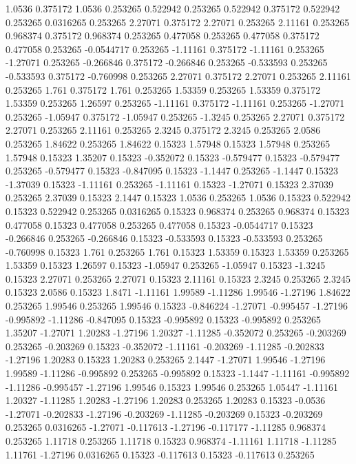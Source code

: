 1.0536 0.375172
1.0536 0.253265
0.522942 0.253265
0.522942 0.375172
0.522942 0.253265
0.0316265 0.253265
2.27071 0.375172
2.27071 0.253265
2.11161 0.253265
0.968374 0.375172
0.968374 0.253265
0.477058 0.253265
0.477058 0.375172
0.477058 0.253265
-0.0544717 0.253265
-1.11161 0.375172
-1.11161 0.253265
-1.27071 0.253265
-0.266846 0.375172
-0.266846 0.253265
-0.533593 0.253265
-0.533593 0.375172
-0.760998 0.253265
2.27071 0.375172
2.27071 0.253265
2.11161 0.253265
1.761 0.375172
1.761 0.253265
1.53359 0.253265
1.53359 0.375172
1.53359 0.253265
1.26597 0.253265
-1.11161 0.375172
-1.11161 0.253265
-1.27071 0.253265
-1.05947 0.375172
-1.05947 0.253265
-1.3245 0.253265
2.27071 0.375172
2.27071 0.253265
2.11161 0.253265
2.3245 0.375172
2.3245 0.253265
2.0586 0.253265
1.84622 0.253265
1.84622 0.15323
1.57948 0.15323
1.57948 0.253265
1.57948 0.15323
1.35207 0.15323
-0.352072 0.15323
-0.579477 0.15323
-0.579477 0.253265
-0.579477 0.15323
-0.847095 0.15323
-1.1447 0.253265
-1.1447 0.15323
-1.37039 0.15323
-1.11161 0.253265
-1.11161 0.15323
-1.27071 0.15323
2.37039 0.253265
2.37039 0.15323
2.1447 0.15323
1.0536 0.253265
1.0536 0.15323
0.522942 0.15323
0.522942 0.253265
0.0316265 0.15323
0.968374 0.253265
0.968374 0.15323
0.477058 0.15323
0.477058 0.253265
0.477058 0.15323
-0.0544717 0.15323
-0.266846 0.253265
-0.266846 0.15323
-0.533593 0.15323
-0.533593 0.253265
-0.760998 0.15323
1.761 0.253265
1.761 0.15323
1.53359 0.15323
1.53359 0.253265
1.53359 0.15323
1.26597 0.15323
-1.05947 0.253265
-1.05947 0.15323
-1.3245 0.15323
2.27071 0.253265
2.27071 0.15323
2.11161 0.15323
2.3245 0.253265
2.3245 0.15323
2.0586 0.15323
1.8471 -1.11161
1.99589 -1.11286
1.99546 -1.27196
1.84622 0.253265
1.99546 0.253265
1.99546 0.15323
-0.846224 -1.27071
-0.995457 -1.27196
-0.995892 -1.11286
-0.847095 0.15323
-0.995892 0.15323
-0.995892 0.253265
1.35207 -1.27071
1.20283 -1.27196
1.20327 -1.11285
-0.352072 0.253265
-0.203269 0.253265
-0.203269 0.15323
-0.352072 -1.11161
-0.203269 -1.11285
-0.202833 -1.27196
1.20283 0.15323
1.20283 0.253265
2.1447 -1.27071
1.99546 -1.27196
1.99589 -1.11286
-0.995892 0.253265
-0.995892 0.15323
-1.1447 -1.11161
-0.995892 -1.11286
-0.995457 -1.27196
1.99546 0.15323
1.99546 0.253265
1.05447 -1.11161
1.20327 -1.11285
1.20283 -1.27196
1.20283 0.253265
1.20283 0.15323
-0.0536 -1.27071
-0.202833 -1.27196
-0.203269 -1.11285
-0.203269 0.15323
-0.203269 0.253265
0.0316265 -1.27071
-0.117613 -1.27196
-0.117177 -1.11285
0.968374 0.253265
1.11718 0.253265
1.11718 0.15323
0.968374 -1.11161
1.11718 -1.11285
1.11761 -1.27196
0.0316265 0.15323
-0.117613 0.15323
-0.117613 0.253265
